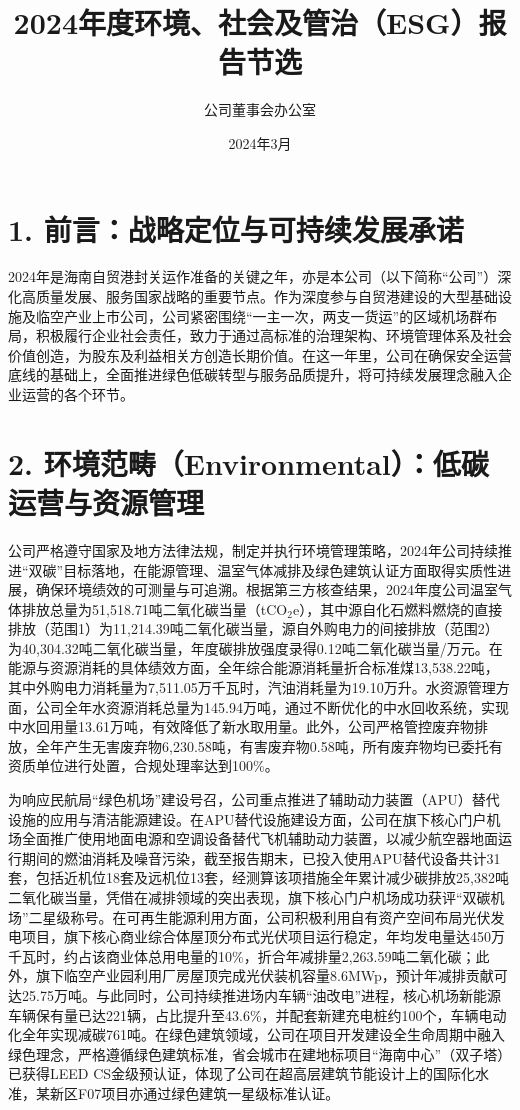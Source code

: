 \documentclass[a4paper,12pt]{article}
\title{\textbf{2024年度环境、社会及管治（ESG）报告节选}}
\author{公司董事会办公室}
\date{2024年3月}
\begin{document}
\maketitle


\section{1. 前言：战略定位与可持续发展承诺}

2024年是海南自贸港封关运作准备的关键之年，亦是本公司（以下简称“公司”）深化高质量发展、服务国家战略的重要节点。作为深度参与自贸港建设的大型基础设施及临空产业上市公司，公司紧密围绕“一主一次，两支一货运”的区域机场群布局，积极履行企业社会责任，致力于通过高标准的治理架构、环境管理体系及社会价值创造，为股东及利益相关方创造长期价值。在这一年里，公司在确保安全运营底线的基础上，全面推进绿色低碳转型与服务品质提升，将可持续发展理念融入企业运营的各个环节。

\section{2. 环境范畴（Environmental）：低碳运营与资源管理}

公司严格遵守国家及地方法律法规，制定并执行环境管理策略，2024年公司持续推进“双碳”目标落地，在能源管理、温室气体减排及绿色建筑认证方面取得实质性进展，确保环境绩效的可测量与可追溯。根据第三方核查结果，2024年度公司温室气体排放总量为51,518.71吨二氧化碳当量（tCO$_2$e），其中源自化石燃料燃烧的直接排放（范围1）为11,214.39吨二氧化碳当量，源自外购电力的间接排放（范围2）为40,304.32吨二氧化碳当量，年度碳排放强度录得0.12吨二氧化碳当量/万元。在能源与资源消耗的具体绩效方面，全年综合能源消耗量折合标准煤13,538.22吨，其中外购电力消耗量为7,511.05万千瓦时，汽油消耗量为19.10万升。水资源管理方面，公司全年水资源消耗总量为145.94万吨，通过不断优化的中水回收系统，实现中水回用量13.61万吨，有效降低了新水取用量。此外，公司严格管控废弃物排放，全年产生无害废弃物6,230.58吨，有害废弃物0.58吨，所有废弃物均已委托有资质单位进行处置，合规处理率达到100\%。

为响应民航局“绿色机场”建设号召，公司重点推进了辅助动力装置（APU）替代设施的应用与清洁能源建设。在APU替代设施建设方面，公司在旗下核心门户机场全面推广使用地面电源和空调设备替代飞机辅助动力装置，以减少航空器地面运行期间的燃油消耗及噪音污染，截至报告期末，已投入使用APU替代设备共计31套，包括近机位18套及远机位13套，经测算该项措施全年累计减少碳排放25,382吨二氧化碳当量，凭借在减排领域的突出表现，旗下核心门户机场成功获评“双碳机场”二星级称号。在可再生能源利用方面，公司积极利用自有资产空间布局光伏发电项目，旗下核心商业综合体屋顶分布式光伏项目运行稳定，年均发电量达450万千瓦时，约占该商业体总用电量的10\%，折合年减排量2,263.59吨二氧化碳；此外，旗下临空产业园利用厂房屋顶完成光伏装机容量8.6MWp，预计年减排贡献可达25.75万吨。与此同时，公司持续推进场内车辆“油改电”进程，核心机场新能源车辆保有量已达221辆，占比提升至43.6\%，并配套新建充电桩约100个，车辆电动化全年实现减碳761吨。在绿色建筑领域，公司在项目开发建设全生命周期中融入绿色理念，严格遵循绿色建筑标准，省会城市在建地标项目“海南中心”（双子塔）已获得LEED CS金级预认证，体现了公司在超高层建筑节能设计上的国际化水准，某新区F07项目亦通过绿色建筑一星级标准认证。
\end{document}
